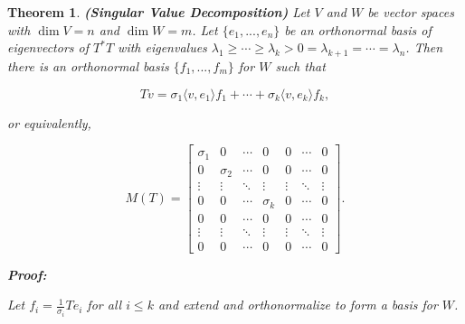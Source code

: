 \documentclass{article}
\theoremstyle{colontheorem}
\newtheorem{theorem}{Theorem}[section]
\newenvironment{Theorem}
{
	\begin{mdframed}[backgroundcolor=TheoremOrange!10]
	\begin{theorem}
}
{
	\end{theorem}
	\end{mdframed}
	
	\vspace{.15in}
}
\newenvironment{Proof}
{
	\begin{mdframed}[backgroundcolor=ProofPurple!10]
	\textbf{Proof:}%
}
{
	\end{mdframed}
	
	\vspace{.085in}
}
\begin{document}
\begin{Theorem}
	
	\textbf{(Singular Value Decomposition)} Let $V$ and $W$ be vector spaces with $\dim V = n$ and $\dim W = m$. Let $\{e_1, ..., e_n\}$ be an orthonormal basis of eigenvectors of $T^* T$ with eigenvalues $\lambda_1 \geq \cdots \geq \lambda_k > 0 = \lambda_{k+1} = \cdots = \lambda_n$. Then there is an orthonormal basis $\{f_1, ..., f_m\}$ for $W$ such that
	
	$$Tv = \sigma_1 \langle v, e_1 \rangle f_1 + \cdots + \sigma_k \langle v, e_k \rangle f_k,$$
	
	or equivalently,
	
	$$
	M(T) = \begin{bmatrix}
	
	\sigma_1 & 0 & \cdots & 0 & 0 & \cdots & 0\\
	0 & \sigma_2 & \cdots & 0 & 0 & \cdots & 0\\
	\vdots & \vdots & \ddots & \vdots & \vdots & \ddots & \vdots\\
	0 & 0 & \cdots & \sigma_k & 0 & \cdots & 0\\
	0 & 0 & \cdots & 0 & 0 & \cdots & 0\\
	\vdots & \vdots & \ddots & \vdots & \vdots & \ddots & \vdots\\
	0 & 0 & \cdots & 0 & 0 & \cdots & 0
	
	\end{bmatrix}.
	$$
	
	\begin{Proof}
		Let $f_i = \frac{1}{\sigma_i}Te_i$ for all $i \leq k$ and extend and orthonormalize to form a basis for $W$.
		
	\end{Proof}
	
\end{Theorem}
\end{document}
